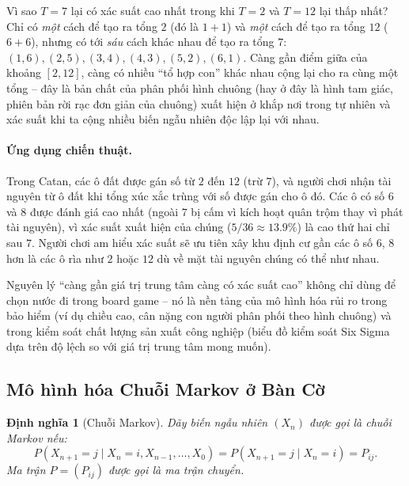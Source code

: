 \documentclass[12pt,a4paper]{article}
\theoremstyle{coloredthm}
\theoremstyle{coloreddef}
\newtheorem{definition}[theorem]{Định nghĩa}
\theoremstyle{remark}
\begin{document}
\begin{giaithich}
Vì sao $T=7$ lại có xác suất cao nhất trong khi $T=2$ và $T=12$ lại thấp nhất? Chỉ có \emph{một} cách để tạo ra tổng $2$ (đó là $1{+}1$) và \emph{một} cách để tạo ra tổng $12$ ($6{+}6$), nhưng có tới \emph{sáu} cách khác nhau để tạo ra tổng $7$: $(1,6),(2,5),(3,4),(4,3),(5,2),(6,1)$. Càng gần điểm giữa của khoảng $[2,12]$, càng có nhiều ``tổ hợp con'' khác nhau cộng lại cho ra cùng một tổng -- đây là bản chất của phân phối hình chuông (hay ở đây là hình tam giác, phiên bản rời rạc đơn giản của chuông) xuất hiện ở khắp nơi trong tự nhiên và xác suất khi ta cộng nhiều biến ngẫu nhiên độc lập lại với nhau.
\end{giaithich}

\paragraph{Ứng dụng chiến thuật.} Trong Catan, các ô đất được gán số từ $2$ đến $12$ (trừ $7$), và người chơi nhận tài nguyên từ ô đất khi tổng xúc xắc trùng với số được gán cho ô đó. Các ô có số $6$ và $8$ được đánh giá cao nhất (ngoài $7$ bị cấm vì kích hoạt quân trộm thay vì phát tài nguyên), vì xác suất xuất hiện của chúng ($5/36 \approx 13.9\%$) là cao thứ hai chỉ sau $7$. Người chơi am hiểu xác suất sẽ ưu tiên xây khu định cư gần các ô số $6$, $8$ hơn là các ô rìa như $2$ hoặc $12$ dù về mặt tài nguyên chúng có thể như nhau.

\begin{ungdung}
Nguyên lý ``càng gần giá trị trung tâm càng có xác suất cao'' không chỉ dùng để chọn nước đi trong board game -- nó là nền tảng của mô hình hóa rủi ro trong bảo hiểm (ví dụ chiều cao, cân nặng con người phân phối theo hình chuông) và trong kiểm soát chất lượng sản xuất công nghiệp (biểu đồ kiểm soát Six Sigma dựa trên độ lệch so với giá trị trung tâm mong muốn).
\end{ungdung}

\subsection{Mô hình hóa Chuỗi Markov ở Bàn Cờ}

\begin{definition}[Chuỗi Markov]
Dãy biến ngẫu nhiên $(X_n)$ được gọi là chuỗi Markov nếu:
\[
P(X_{n+1} = j \mid X_n = i, X_{n-1},\dots, X_0) = P(X_{n+1} = j \mid X_n = i) = P_{ij}.
\]
Ma trận $P = (P_{ij})$ được gọi là ma trận chuyển.
\end{definition}
\end{document}
